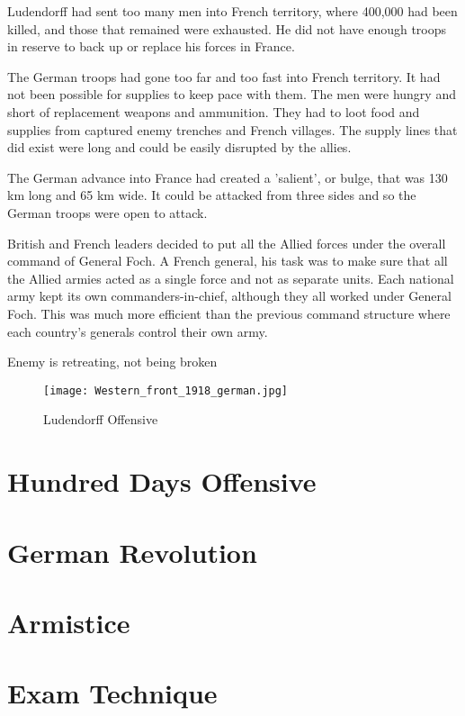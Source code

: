 \documentclass[a4paper,numbers=endperiod,most,twoside,english,final,openany]{scrbook} %
\renewcommand{\chaptername}{Topic}
\begin{document}
\begin{description}
	\item[Tired troops] Ludendorff had sent too many men into French territory, where 400,000 had been killed, and those that remained were exhausted. He did not have enough troops in reserve to back up or replace his forces in France.
	\item [Long supply lines] The German troops had gone too far and too fast into French territory. It had not been possible for supplies to keep pace with them. The men were hungry and short of replacement weapons and ammunition. They had to loot food and supplies from captured enemy trenches and French villages. The supply lines that did exist were long and could be easily disrupted by the allies.
	\item [Salient] The German advance into France had created a 'salient', or bulge, that was 130 km long and 65 km wide. It could be attacked from three sides and so the German troops were open to attack.
	\item [Effective allied command] British and French leaders decided to put all the Allied forces under the overall command of General Foch. A French general, his task was to make sure that all the Allied armies acted as a single force and not as separate units. Each national army kept its own commanders-in-chief, although they all worked under General Foch. This was much more efficient than the previous command structure where each country's generals control their own army.
	\item Enemy is retreating, not being broken %
\end{description}

\begin{figure}
\texttt{[image: Western\_front\_1918\_german.jpg]}
\caption{Ludendorff Offensive}
\end{figure}

\chapter{Hundred Days Offensive}



\chapter{German Revolution}
\chapter{Armistice}

\appendix
\renewcommand{\chaptermark}[1]{\markboth{\MakeUppercase{#1}\quad{}(\chaptername\ \thechapter)}{\MakeUppercase{#1}\quad{}(\appendixname\ \thechapter)}}

\chapter{Exam Technique}
\blinddocument

\backmatter\renewcommand{\chaptermark}[1]{\markboth{\MakeUppercase{#1}}{\MakeUppercase{#1}}}

\end{document}
